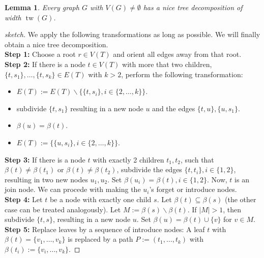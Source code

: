 \documentclass[11pt,a4paper]{article}
\newtheorem*{lemma}{Lemma}
\DeclareMathOperator{\tw}{tw}
\begin{document}
\begin{lemma}
Every graph $G$ with $V(G) \not = \emptyset$ has a nice tree decomposition of width $\tw(G)$.
\end{lemma}

\begin{proof}[sketch]
We apply the following transformations as long as possible. We will finally obtain a nice tree decomposition. \\

\textbf{Step 1:} Choose a root $r \in V(T)$ and orient all edges away from that root. \\

\textbf{Step 2:} If there is a node $t \in V(T)$ with more that two children, $\{t, s_{1}\}, \dots, \{t, s_{k}\} \in E(T)$ with $k > 2$, perform the following transformation: \\

\begin{itemize}
\item $E(T) := E(T) \backslash \{\{t, s_{i}\}, i \in \{2, \dots, k\}\}$.
\item subdivide $\{t, s_{1}\}$ resulting in a new node $u$ and the edges $\{t, u\}, \{u, s_{1}\}$.
\item $\beta(u) = \beta(t)$.
\item $E(T) := \{\{u, s_{i}\}, i \in \{2, \dots, k\}\}$.
\end{itemize}

\textbf{Step 3:} If there is a node $t$ with exactly 2 children $t_{1}, t_{2}$, such that $\beta(t) \not = \beta(t_{1})$ or $\beta(t) \not = \beta(t_{2})$, subdivide the edges $\{t, t_{i}\}, i \in \{1,2\}$, resulting in two new nodes $u_{1}, u_{2}$. Set $\beta(u_{i}) = \beta(t), i \in \{1,2\}$. Now, $t$ is an join node. We can procede with making the $u_{i}$'s forget or introduce nodes. \\

\textbf{Step 4:} Let $t$ be a node with exactly one child $s$. Let $\beta(t) \subseteq \beta(s)$ (the other case can be treated analogously). Let $M := \beta(s) \backslash \beta(t)$. If $|M| > 1$, then subdivide $\{t, s\}$, resulting in a new node $u$. Set $\beta(u) = \beta(t) \cup \{v\}$ for $v \in M$. \\

\textbf{Step 5:} Replace leaves by a sequence of introduce nodes: A leaf $t$ with $\beta(t) = \{v_{1}, \dots, v_{k}\}$ is replaced by a path $P := (t_{1}, \dots, t_{k})$ with $\beta(t_{i}) := \{v_{i}, \dots, v_{k}\}$.
\end{proof}
\end{document}
